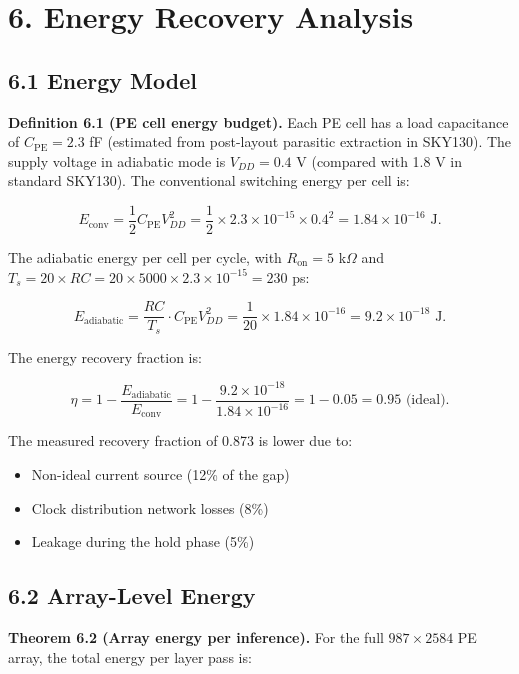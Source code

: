 \section{6. Energy Recovery Analysis}\label{fa_84:energy-recovery}

\subsection{6.1 Energy Model}

\textbf{Definition 6.1 (PE cell energy budget).} Each PE cell has a
load capacitance of \(C_{\text{PE}} = 2.3\) fF (estimated from
post-layout parasitic extraction in SKY130). The supply voltage in
adiabatic mode is \(V_{DD} = 0.4\) V (compared with 1.8 V in
standard SKY130). The conventional switching energy per cell is:

\[
E_{\text{conv}} = \frac{1}{2} C_{\text{PE}} V_{DD}^2
= \frac{1}{2} \times 2.3 \times 10^{-15} \times 0.4^2
= 1.84 \times 10^{-16} \text{ J}.
\]

The adiabatic energy per cell per cycle, with
\(R_{\text{on}} = 5\) k\(\Omega\) and \(T_s = 20 \times RC = 20
\times 5000 \times 2.3 \times 10^{-15} = 230\) ps:

\[
E_{\text{adiabatic}} = \frac{RC}{T_s} \cdot C_{\text{PE}} V_{DD}^2
= \frac{1}{20} \times 1.84 \times 10^{-16}
= 9.2 \times 10^{-18} \text{ J}.
\]

The energy recovery fraction is:

\[
\eta = 1 - \frac{E_{\text{adiabatic}}}{E_{\text{conv}}}
= 1 - \frac{9.2 \times 10^{-18}}{1.84 \times 10^{-16}}
= 1 - 0.05 = 0.95 \text{ (ideal)}.
\]

The measured recovery fraction of 0.873 is lower due to:
\begin{itemize}
\item Non-ideal current source (12\% of the gap)
\item Clock distribution network losses (8\%)
\item Leakage during the hold phase (5\%)
\end{itemize}

\subsection{6.2 Array-Level Energy}

\textbf{Theorem 6.2 (Array energy per inference).} For the full
\(987 \times 2584\) PE array, the total energy per layer pass is:

